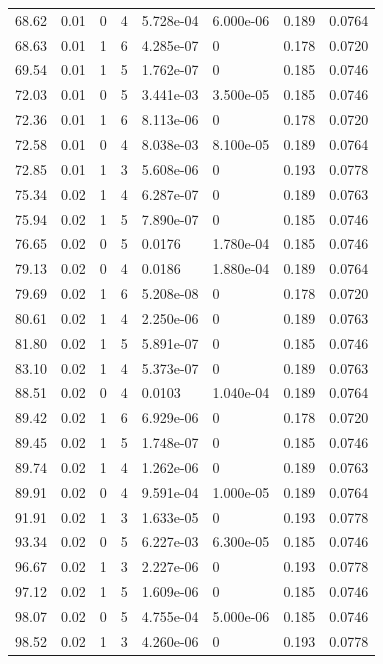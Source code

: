 \documentclass[preview]{standalone}
\begin{document}
{{{\begin{tabular}{L{1.2cm}C{1.2cm} C{0.3cm}C{0.5cm} C{1.4cm}C{1.4cm} C{1.4cm}C{1.4cm}}
  68.62  &  0.01  & 0     &  4 &  5.728e-04  & 6.000e-06  & 0.189 &  0.0764   \\ 
  68.63  &  0.01  & 1     &  6 &  4.285e-07  & 0  & 0.178 &  0.0720   \\ 
  69.54  &  0.01  & 1     &  5 &  1.762e-07  & 0  & 0.185 &  0.0746   \\ 
  72.03  &  0.01  & 0     &  5 &  3.441e-03  & 3.500e-05  & 0.185 &  0.0746   \\ 
  72.36  &  0.01  & 1     &  6 &  8.113e-06  & 0  & 0.178 &  0.0720   \\ 
  72.58  &  0.01  & 0     &  4 &  8.038e-03  & 8.100e-05  & 0.189 &  0.0764   \\ 
  72.85  &  0.01  & 1     &  3 &  5.608e-06  & 0  & 0.193 &  0.0778   \\ 
  75.34  &  0.02  & 1     &  4 &  6.287e-07  & 0  & 0.189 &  0.0763   \\ 
  75.94  &  0.02  & 1     &  5 &  7.890e-07  & 0  & 0.185 &  0.0746   \\ 
  76.65  &  0.02  & 0     &  5 &  0.0176  & 1.780e-04  & 0.185 &  0.0746   \\ 
  79.13  &  0.02  & 0     &  4 &  0.0186  & 1.880e-04  & 0.189 &  0.0764   \\ 
  79.69  &  0.02  & 1     &  6 &  5.208e-08  & 0  & 0.178 &  0.0720   \\ 
  80.61  &  0.02  & 1     &  4 &  2.250e-06  & 0  & 0.189 &  0.0763   \\ 
  81.80  &  0.02  & 1     &  5 &  5.891e-07  & 0  & 0.185 &  0.0746   \\ 
  83.10  &  0.02  & 1     &  4 &  5.373e-07  & 0  & 0.189 &  0.0763   \\ 
  88.51  &  0.02  & 0     &  4 &  0.0103  & 1.040e-04  & 0.189 &  0.0764   \\ 
  89.42  &  0.02  & 1     &  6 &  6.929e-06  & 0  & 0.178 &  0.0720   \\ 
  89.45  &  0.02  & 1     &  5 &  1.748e-07  & 0  & 0.185 &  0.0746   \\ 
  89.74  &  0.02  & 1     &  4 &  1.262e-06  & 0  & 0.189 &  0.0763   \\ 
  89.91  &  0.02  & 0     &  4 &  9.591e-04  & 1.000e-05  & 0.189 &  0.0764   \\ 
  91.91  &  0.02  & 1     &  3 &  1.633e-05  & 0  & 0.193 &  0.0778   \\ 
  93.34  &  0.02  & 0     &  5 &  6.227e-03  & 6.300e-05  & 0.185 &  0.0746   \\ 
  96.67  &  0.02  & 1     &  3 &  2.227e-06  & 0  & 0.193 &  0.0778   \\ 
  97.12  &  0.02  & 1     &  5 &  1.609e-06  & 0  & 0.185 &  0.0746   \\ 
  98.07  &  0.02  & 0     &  5 &  4.755e-04  & 5.000e-06  & 0.185 &  0.0746   \\ 
  98.52  &  0.02  & 1     &  3 &  4.260e-06  & 0  & 0.193 &  0.0778   \\ 
\hline 
\end{tabular} 

}}}
\end{document}

